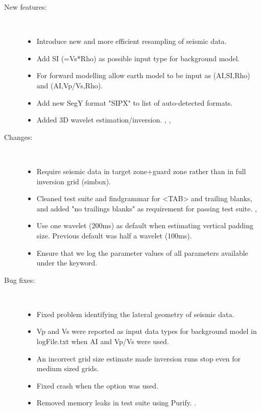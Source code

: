 \begin{description}

\item [New features:] \mbox{ }
  \begin{itemize}
    \item Introduce new and more efficient resampling of seismic
      data. 
    \item Add SI (=Vs*Rho) as possible input type for background
      model. 
    \item For forward modelling allow earth model to be input as
      (AI,SI,Rho) and (AI,Vp/Vs,Rho). 
    \item Add new SegY format "SIPX" to list of auto-detected
      formats.
    \item Added 3D wavelet estimation/inversion. , ,
  \end{itemize}

\item [Changes:] \mbox{ }
  \begin{itemize}
    \item Require seismic data in target zone+guard zone rather than
      in full inversion grid (simbox). 
    \item Cleaned test suite and findgrammar for <TAB> and trailing
      blanks, and added "no trailings blanks" as requirement for passing
      test suite. , 
    \item Use one wavelet (200ms) as default when estimating vertical
      padding size. Previous default was half a wavelet
      (100ms). 
    \item Ensure that we log the parameter values of all parameters
      available under the  keyword. 
  \end{itemize}

\item [Bug fixes:] \mbox{ }
  \begin{itemize}
    \item Fixed problem identifying the lateral geometry of seismic
      data. 
    \item Vp and Vs were reported as input data types for background
      model in logFile.txt when AI and Vp/Vs were used. 
    \item An incorrect grid size estimate made inversion runs stop
      even for medium sized grids. 
    \item Fixed crash when the  option was
      used. 
    \item Removed memory leaks in test suite using Purify. .
  \end{itemize}
\end{description}


